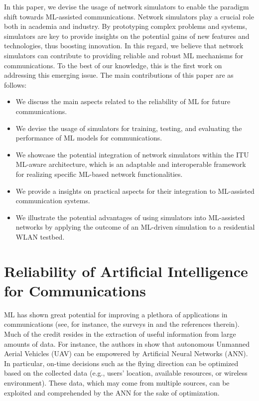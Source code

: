 \documentclass[journal]{IEEEtran}
\begin{document}
	In this paper, we devise the usage of network simulators to enable the paradigm shift towards ML-assisted communications. Network simulators play a crucial role both in academia and industry. By prototyping complex problems and systems, simulators are key to provide insights on the potential gains of new features and technologies, thus boosting innovation. In this regard, we believe that network simulators can contribute to providing reliable and robust ML mechanisms for communications. To the best of our knowledge, this is the first work on addressing this emerging issue. The main contributions of this paper are as follows:
	\begin{itemize}
		\item We discuss the main aspects related to the reliability of ML for future communications.
		\item We devise the usage of simulators for training, testing, and evaluating the performance of ML models for communications.
		\item We showcase the potential integration of network simulators within the ITU ML-aware architecture, which is an adaptable and interoperable framework for realizing specific ML-based network functionalities.
		\item We provide a insights on practical aspects for their integration to ML-assisted communication systems. 
		\item We illustrate the potential advantages of using simulators into ML-assisted networks by applying the outcome of an ML-driven simulation to a residential WLAN testbed.
	\end{itemize}
		
	\section{Reliability of Artificial Intelligence for Communications}
	
	ML has shown great potential for improving a plethora of applications in communications (see, for instance, the surveys in \cite{survey2,survey3,survey4,survey5,survey6} and the references therein). Much of the credit resides in the extraction of useful information from large amounts of data. For instance, the authors in \cite{survey4} show that autonomous Unmanned Aerial Vehicles (UAV) can be empowered by Artificial Neural Networks (ANN). In particular, on-time decisions such as the flying direction can be optimized based on the collected data (e.g., users' location, available resources, or wireless environment). These data, which may come from multiple sources, can be exploited and comprehended by the ANN for the sake of optimization.
	
\end{document}
